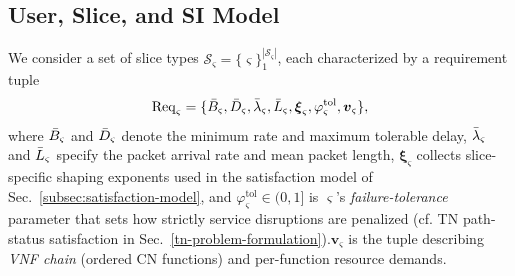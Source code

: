 \documentclass[12pt,lettersize,journal,onecolumn]{IEEEtran}
\begin{document}

\subsection{User, Slice, and SI Model} \label{user-slice-model-subsection}
We consider a set of slice types $\mathcal{S}_{\varsigma}=\{\varsigma\}_{1}^{|\mathcal{S}_{\varsigma}|}$, each characterized by a requirement tuple
\begin{align}
\label{slice-req-definition}
\mathrm{Req}_{\varsigma}
=
\{\Bar{B}_{\varsigma}, \Bar{D}_{\varsigma}, \Bar{\lambda}_{\varsigma}, \Bar{L}_{\varsigma},
\boldsymbol{\xi}_{\varsigma},
\varphi^{\mathrm{tol}}_{\varsigma},
\boldsymbol{v}_{\varsigma}\},
\end{align}
where $\Bar{B}_{\varsigma}$ and $\Bar{D}_{\varsigma}$ denote the minimum rate and maximum tolerable delay, $\Bar{\lambda}_{\varsigma}$ and $\Bar{L}_{\varsigma}$ specify the packet arrival rate and mean packet length, $\boldsymbol{\xi}_{\varsigma}$ collects slice-specific shaping exponents used in the satisfaction model of Sec.~\ref{subsec:satisfaction-model}, and $\varphi^{\mathrm{tol}}_{\varsigma}\in(0,1]$ is $\varsigma$'s \emph{failure-tolerance} parameter that sets how strictly service disruptions are penalized (cf. TN path-status satisfaction in Sec.~\ref{tn-problem-formulation}).$\boldsymbol{v}_{\varsigma}$ is the tuple describing \textit{VNF chain} (ordered CN functions) and per-function resource demands. 
\end{document}
